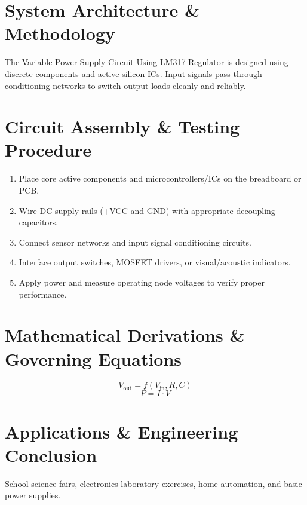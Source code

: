 \documentclass[11pt,a4paper]{article}
\begin{document}
\section{System Architecture \& Methodology}
The Variable Power Supply Circuit Using LM317 Regulator is designed using discrete components and active silicon ICs. Input signals pass through conditioning networks to switch output loads cleanly and reliably.

\section{Circuit Assembly \& Testing Procedure}
\begin{enumerate}
    \item Place core active components and microcontrollers/ICs on the breadboard or PCB.
    \item Wire DC supply rails (+VCC and GND) with appropriate decoupling capacitors.
    \item Connect sensor networks and input signal conditioning circuits.
    \item Interface output switches, MOSFET drivers, or visual/acoustic indicators.
    \item Apply power and measure operating node voltages to verify proper performance.
\end{enumerate}

\section{Mathematical Derivations \& Governing Equations}
\begin{equation}
V_{\text{out}} = f(V_{\text{in}}, R, C)
\end{equation}
\begin{equation}
P = I \cdot V
\end{equation}

\section{Applications \& Engineering Conclusion}
School science fairs, electronics laboratory exercises, home automation, and basic power supplies.
\end{document}
